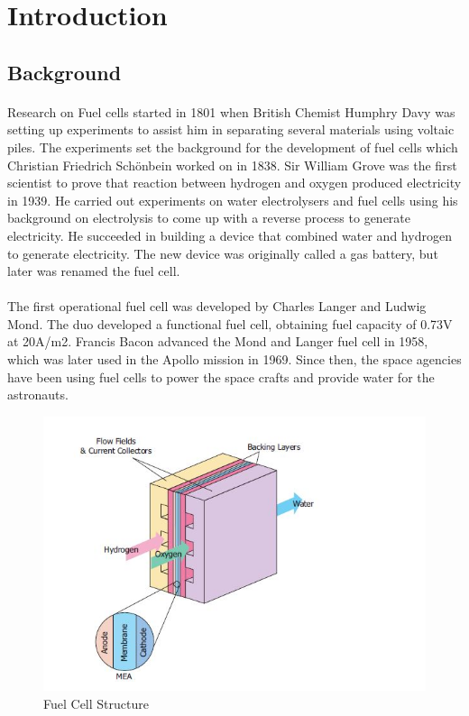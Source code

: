 \section{Introduction}
\label{sec:introduction}
\subsection{Background}
\paragraph{}Research on Fuel cells started in 1801 when British Chemist Humphry Davy was setting up experiments to assist him in separating several materials using voltaic piles. The experiments set the background for the development of fuel cells which Christian Friedrich Schönbein worked on in 1838. Sir William Grove was the first scientist to prove that reaction between hydrogen and oxygen produced electricity in 1939. He carried out experiments on water electrolysers and fuel cells using his background on electrolysis to come up with a reverse process to generate electricity. He succeeded in building a device that combined water and hydrogen to generate electricity. The new device was originally called a gas battery, but later was renamed the fuel cell.
\paragraph{}The first operational fuel cell was developed by Charles Langer and Ludwig Mond. The duo developed a functional fuel cell, obtaining fuel capacity of 0.73V at 20A/m2. Francis Bacon advanced the Mond and Langer fuel cell in 1958, which was later used in the Apollo mission in 1969. Since then, the space agencies have been using fuel cells to power the space crafts and provide water for the astronauts.
\begin{figure}
\includegraphics{Figures/Figure3}
\caption{Fuel Cell Structure
\cite{pukrushpan_modeling_2003}}
\end{figure}

